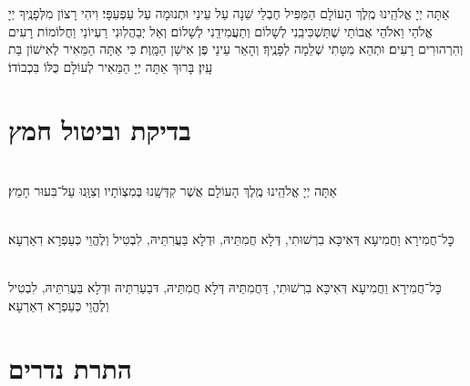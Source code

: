 \documentclass[twoside, openany, parskip=half, 11pt]{book}
\begin{document}
אַתָּה יְיָ אֱלֹהֵֽינוּ מֶֽלֶךְ הָעוֹלָם הַמַּפִּיל חֶבְלֵי שֵׁנָה עַל עֵינַי וּתְנוּמָה עַל עַפְעַפָּי׃ וִיהִי רָצוֹן מִלְּפָנֶֽיךָ יְיָ אֱלֹהַי וֵאלֹהֵי אֲבוֹתַי שֶׁתַּשְׁכִּיבֵֽנִי לְשָׁלוֹם וְתַעֲמִידֵֽנִי לְשָׁלוֹם׃ וְאַל יְבַהֲלֽוּנִי רַעְיוֹנַי וַחֲלוֹמוֹת רָעִים וְהִרְהוּרִים רָעִים׃ וּתְהֵא מִטָּתִי שְׁלֵמָה לְפָנֶֽיךָ׃ וְהָאֵר עֵינַי פֶּן אִישַׁן הַמָּֽוֶת׃ כִּי אַתָּה הַמֵּאִיר לְאִישׁוֹן בַּת עָֽיִן׃ בָּרוּךְ אַתָּה יְיָ הַמֵּאִיר לְעוֹלָם כֻּלּוֹ בִּכְבוֹדוֹ׃


\chapter[בדיקת וביטול חמץ]{ בדיקת וביטול חמץ }

\\
אַתָּה יְיָ אֱלֹהֵֽינוּ מֶֽלֶךְ הָעוֹלָם אֲשֶׁר קִדְּשָֽׁנוּ בְּמִצְוֹתָיו וְצִוָּֽנוּ עַל־בִּעוּר חָמֵץ׃


\\
כׇּל־חֲמִירָא וַחֲמִיעָא דְּאִיכָּא בִרְשׁוּתִי, דְּלָא חֲמִתֵּיהּ, וּדְלָא בַּעֲרִתֵּיהּ, לִבְטִיל וְלֶהֱוֵי כְּעַפְרָא דִאַרְעָא׃


\\
כׇּל־חֲמִירָא וַחֲמִיעָא דְּאִיכָּא בִרְשׁוּתִי, דַּחֲמִתֵּיהּ דְּלָא חֲמִתֵּיהּ, דּבַעַרִתֵּיהּ וּדְלָא בַּעֲרִתֵּיהּ, לִבְטִיל וְלֶהֱוֵי כְּעַפְרָא דִאַרְעָא׃



\chapter[התרת נדרים]{ התרת נדרים }

\end{document}
